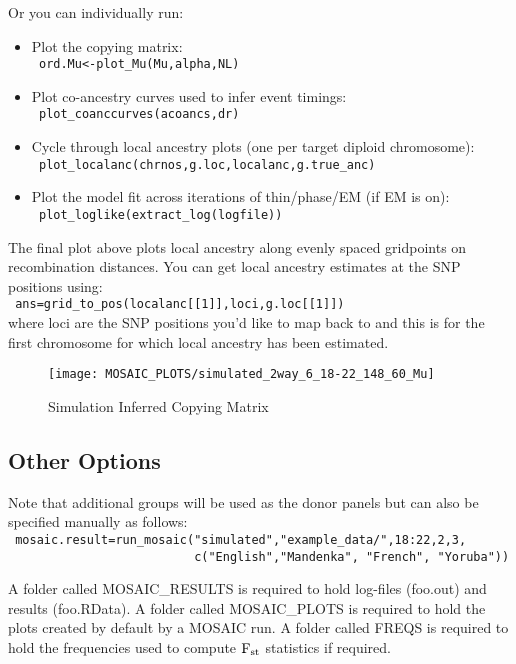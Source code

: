 \documentclass{article}
\begin{document}
Or you can individually run:
\begin{itemize}
  \item Plot the copying matrix:\\
\verb+ ord.Mu<-plot_Mu(Mu,alpha,NL) +
\item Plot co-ancestry curves used to infer event timings:\\
\verb+ plot_coanccurves(acoancs,dr)+
\item Cycle through local ancestry plots (one per target diploid chromosome):\\
\verb+ plot_localanc(chrnos,g.loc,localanc,g.true_anc)+ 
\item Plot the model fit across iterations of thin/phase/EM (if EM is on):\\
\verb+ plot_loglike(extract_log(logfile))+
\end{itemize}

The final plot above plots local ancestry along evenly spaced gridpoints on recombination distances. You can get 
local ancestry estimates at the SNP positions using:\\
\verb+ ans=grid_to_pos(localanc[[1]],loci,g.loc[[1]])+\\
where loci are the SNP positions you'd like to map back to and this is for the first chromosome for which local ancestry has been estimated.


\begin{figure} \centering
    \texttt{[image: MOSAIC\_PLOTS/simulated\_2way\_6\_18-22\_148\_60\_Mu]}
    \caption{Simulation Inferred Copying Matrix}\label{simMu}
\end{figure}

\subsection{Other Options}
Note that additional groups will be used as the donor panels but can also be specified manually as follows:\\
\verb+ mosaic.result=run_mosaic("simulated","example_data/",18:22,2,3,+\\
\verb+                          c("English","Mandenka", "French", "Yoruba"))+

A folder called MOSAIC\_RESULTS is required to hold log-files (foo.out) and results (foo.RData).  
A folder called MOSAIC\_PLOTS is required to hold the plots created by default by a MOSAIC run.
A folder called FREQS is required to hold the frequencies used to compute $\textrm{F}_{\textrm{st}}$ statistics if required.
\end{document}
